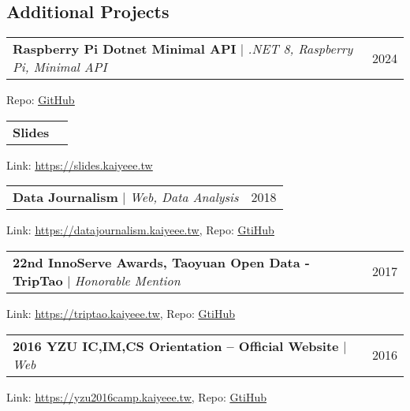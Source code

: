\documentclass[letterpaper,11pt]{article}
\makeatletter
\newcommand{\resumeItem}[1]{
  \item\small{
    {#1 \vspace{-2pt}}
  }
}
\newcommand{\resumeProjectHeading}[2]{
    \item
    \begin{tabular*}{0.97\textwidth}{l@{\extracolsep{\fill}}r}
      \small#1 & #2 \\
    \end{tabular*}\vspace{-7pt}
}
\newcommand{\resumeItemListStart}{\begin{itemize}}
\newcommand{\resumeItemListEnd}{\end{itemize}\vspace{-5pt}}
\makeatother
\begin{document}


\subsection{Additional Projects}

\resumeProjectHeading
{\textbf{Raspberry Pi Dotnet Minimal API} $|$ \footnotesize\emph{.NET 8, Raspberry Pi, Minimal API}\vspace{8pt}}{2024}
{\small{Repo: \href{https://github.com/Oschangkai/rpi-dotnet-minimal-api}{\underline{GitHub}}}}
\vspace{3px}

\resumeProjectHeading
{\textbf{Slides}\vspace{8pt}}{ }
{\small{Link: \href{https://slides.kaiyeee.tw}{\underline{https://slides.kaiyeee.tw}}}}
\vspace{3px}

\resumeProjectHeading
{\textbf{Data Journalism} $|$ \footnotesize\emph{Web, Data Analysis}\vspace{8pt}}{2018}
{\small{Link: \href{https://datajournalism.kaiyeee.tw}{\underline{https://datajournalism.kaiyeee.tw}}, Repo: \href{https://github.com/Oschangkai/datajournalism}{\underline{GtiHub}}}}
\vspace{3px}

\resumeProjectHeading
{\textbf{22nd InnoServe Awards, Taoyuan Open Data - TripTao} $|$ \footnotesize\emph{Honorable Mention}\vspace{8pt}}{2017}
{\small{Link: \href{https://triptao.kaiyeee.tw}{\underline{https://triptao.kaiyeee.tw}}, Repo: \href{https://github.com/Oschangkai/Triptao-Web}{\underline{GtiHub}}}}
\vspace{3px}

\resumeProjectHeading
{\textbf{2016 YZU IC,IM,CS Orientation -- Official Website} $|$ \footnotesize\emph{Web}\vspace{8pt}}{2016}
{\small{Link: \href{https://yzu2016camp.kaiyeee.tw}{\underline{https://yzu2016camp.kaiyeee.tw}}, Repo: \href{https://github.com/Oschangkai/yzu2016camp}{\underline{GtiHub}}}}
\vspace{3px}
\end{document}

